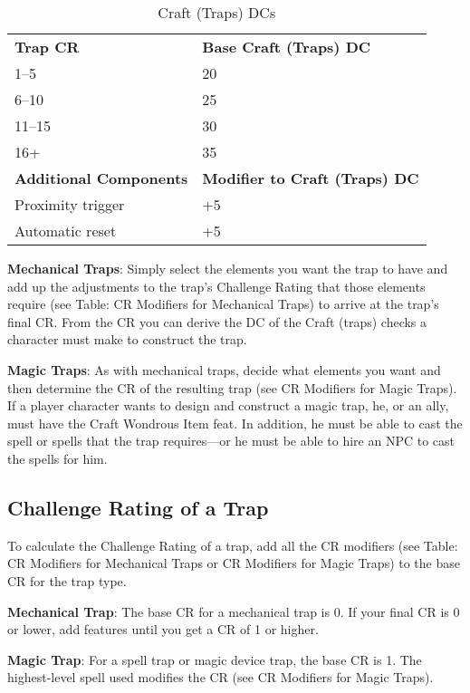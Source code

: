 \begin{table}
 \sffamily
 \caption{Craft (Traps) DCs}
 \begin{tabular}{ll}
\textbf{Trap CR} & \textbf{Base Craft (Traps) DC} \\
1--5 & 20\\
6--10 & 25\\
11--15 & 30\\
16+ & 35\\
\textbf{Additional Components} & \textbf{Modifier to Craft (Traps) DC} \\
Proximity trigger & +5\\
Automatic reset & +5\\
 \end{tabular}

\end{table}

				
\textbf{Mechanical Traps}: Simply select the elements you want the trap to have and add up the adjustments to the trap's Challenge Rating that those elements require (see Table: CR Modifiers for Mechanical Traps) to arrive at the trap's final CR. From the CR you can derive the DC of the Craft (traps) checks a character must make to construct the trap.
				
\textbf{Magic Traps}: As with mechanical traps, decide what elements you want and then determine the CR of the resulting trap (see CR Modifiers for Magic Traps). If a player character wants to design and construct a magic trap, he, or an ally, must have the Craft Wondrous Item feat. In addition, he must be able to cast the spell or spells that the trap requires---or he must be able to hire an NPC to cast the spells for him.
				
\subsection{Challenge Rating of a Trap}

				
To calculate the Challenge Rating of a trap, add all the CR modifiers (see Table: CR Modifiers for Mechanical Traps or CR Modifiers for Magic Traps) to the base CR for the trap type.
				
\textbf{Mechanical Trap}: The base CR for a mechanical trap is 0. If your final CR is 0 or lower, add features until you get a CR of 1 or higher.
				
\textbf{Magic Trap}: For a spell trap or magic device trap, the base CR is 1. The highest-level spell used modifies the CR (see CR Modifiers for Magic Traps).
				
